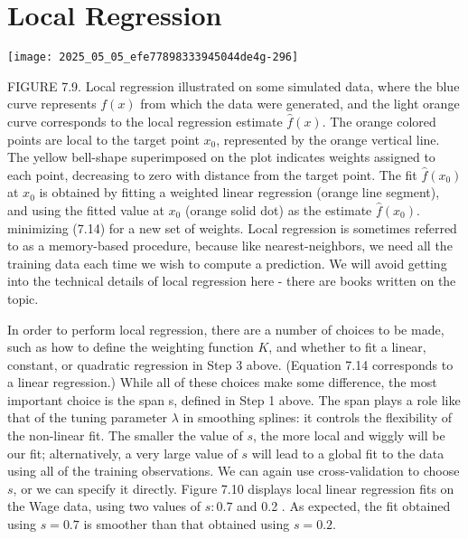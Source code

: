 \documentclass[10pt]{article}
\begin{document}

\section*{Local Regression}
\begin{center}
\texttt{[image: 2025\_05\_05\_efe77898333945044de4g-296]}
\end{center}

FIGURE 7.9. Local regression illustrated on some simulated data, where the blue curve represents $f(x)$ from which the data were generated, and the light orange curve corresponds to the local regression estimate $\hat{f}(x)$. The orange colored points are local to the target point $x_{0}$, represented by the orange vertical line. The yellow bell-shape superimposed on the plot indicates weights assigned to each point, decreasing to zero with distance from the target point. The fit $\hat{f}\left(x_{0}\right)$ at $x_{0}$ is obtained by fitting a weighted linear regression (orange line segment), and using the fitted value at $x_{0}$ (orange solid dot) as the estimate $\hat{f}\left(x_{0}\right)$.\\
minimizing (7.14) for a new set of weights. Local regression is sometimes referred to as a memory-based procedure, because like nearest-neighbors, we need all the training data each time we wish to compute a prediction. We will avoid getting into the technical details of local regression here - there are books written on the topic.

In order to perform local regression, there are a number of choices to be made, such as how to define the weighting function $K$, and whether to fit a linear, constant, or quadratic regression in Step 3 above. (Equation 7.14 corresponds to a linear regression.) While all of these choices make some difference, the most important choice is the span s, defined in Step 1 above. The span plays a role like that of the tuning parameter $\lambda$ in smoothing splines: it controls the flexibility of the non-linear fit. The smaller the value of $s$, the more local and wiggly will be our fit; alternatively, a very large value of $s$ will lead to a global fit to the data using all of the training observations. We can again use cross-validation to choose $s$, or we can specify it directly. Figure 7.10 displays local linear regression fits on the Wage data, using two values of $s: 0.7$ and 0.2 . As expected, the fit obtained using $s=0.7$ is smoother than that obtained using $s=0.2$.
\end{document}
